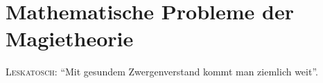 \chapter{Mathematische Probleme der Magietheorie}
\textsc{Leskatosch}: "`Mit gesundem Zwergenverstand kommt man ziemlich weit"'. \cite{leskatosch}